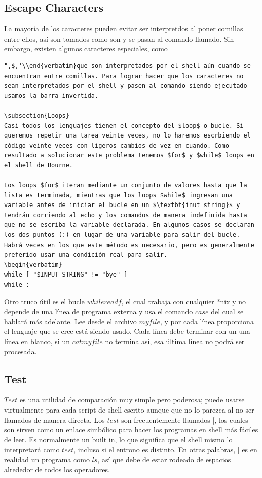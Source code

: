 \documentclass{article}
\begin{document}
\subsection{Escape Characters}
La mayoría de los caracteres pueden evitar ser interpretdos al poner comillas entre ellos, así son tomados como son y se pasan al comando llamado. Sin embargo, existen algunos caracteres especiales, como \begin{verbatim}",$,'\\end{verbatim}que son interpretados por el shell aún cuando se encuentran entre comillas. Para lograr hacer que los caracteres no sean interpretados por el shell y pasen al comando siendo ejecutado usamos la barra invertida.

\subsection{Loops}
Casi todos los lenguajes tienen el concepto del $loop$ o bucle. Si queremos repetir una tarea veinte veces, no lo haremos escrbiendo el código veinte veces con ligeros cambios de vez en cuando. Como resultado a solucionar este problema tenemos $for$ y $while$ loops en el shell de Bourne.

Los loops $for$ iteran mediante un conjunto de valores hasta que la lista es terminada, mientras que los loops $while$ ingresan una variable antes de iniciar el bucle en un $\textbf{inut string}$ y tendrán corriendo al echo y los comandos de manera indefinida hasta que no se escriba la variable declarada. En algunos casos se declaran los dos puntos (:) en lugar de una variable para salir del bucle. Habrá veces en los que este método es necesario, pero es generalmente preferido usar una condición real para salir.
\begin{verbatim}
while [ "$INPUT_STRING" != "bye" ]
while :
\end{verbatim}

Otro truco útil es el bucle $while read f$, el cual trabaja con cualquier *nix y no depende de una línea de programa externa y usa el comando $case$ del cual se hablará más adelante. Lee desde el archivo $myfile$, y por cada línea proporciona el lenguaje que se cree está siendo usado. Cada línea debe terminar con un una línea en blanco, si un $cat myfile$ no termina así, esa última línea no podrá ser procesada. 

\subsection{Test}
$Test$ es una utilidad de comparación muy simple pero poderosa; puede usarse virtualmente para cada script de shell escrito aunque que no lo parezca al no ser llamados de manera directa. Los $test$ son frecuentemente llamados [, los cuales son sirven como un enlace simbólico para hacer los programas en shell más fáciles de leer. Es normalmente un built in, lo que significa que el shell mismo lo interpretará como $test$, incluso si el entrono es distinto. En otras palabras, [ es en realidad un programa como $ls$, así que debe de estar rodeado de espacios alrededor de todos los operadores.
\end{document}
